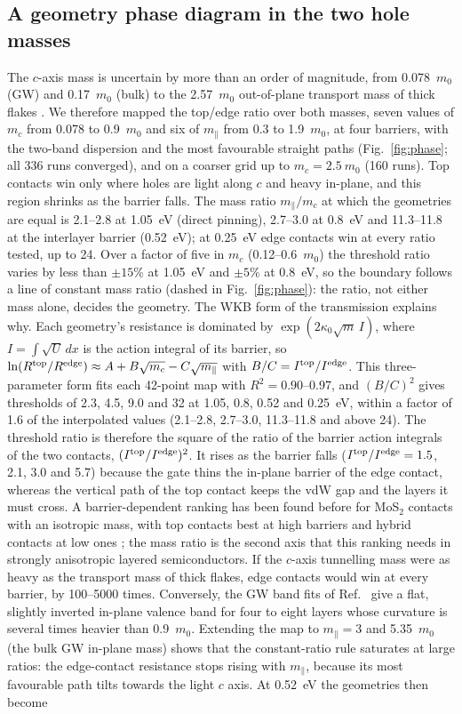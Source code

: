 \documentclass[11pt]{article}
\begin{document}
\subsection{A geometry phase diagram in the two hole masses}
\label{sec:phase}
The $c$-axis mass is uncertain by more than an order of magnitude, from 0.078~$m_0$ (GW) and 0.17~$m_0$ (bulk) to the 2.57~$m_0$ out-of-plane transport mass of thick flakes \cite{refsangwan}. We therefore mapped the top/edge ratio over both masses, seven values of $m_c$ from 0.078 to 0.9~$m_0$ and six of $m_\parallel$ from 0.3 to 1.9~$m_0$, at four barriers, with the two-band dispersion and the most favourable straight paths (Fig.~\ref{fig:phase}; all 336 runs converged), and on a coarser grid up to $m_c=2.5~m_0$ (160 runs). Top contacts win only where holes are light along $c$ and heavy in-plane, and this region shrinks as the barrier falls. The mass ratio $m_\parallel/m_c$ at which the geometries are equal is 2.1--2.8 at 1.05~eV (direct pinning), 2.7--3.0 at 0.8~eV and 11.3--11.8 at the interlayer barrier (0.52~eV); at 0.25~eV edge contacts win at every ratio tested, up to 24. Over a factor of five in $m_c$ (0.12--0.6~$m_0$) the threshold ratio varies by less than $\pm15$\% at 1.05~eV and $\pm5$\% at 0.8~eV, so the boundary follows a line of constant mass ratio (dashed in Fig.~\ref{fig:phase}): the ratio, not either mass alone, decides the geometry. The WKB form of the transmission explains why. Each geometry's resistance is dominated by $\exp(2\kappa_0\sqrt{m}\,I)$, where $I=\int\sqrt{U}\,dx$ is the action integral of its barrier, so $\ln(R^{\rm top}/R^{\rm edge})\approx A+B\sqrt{m_c}-C\sqrt{m_\parallel}$ with $B/C=I^{\rm top}/I^{\rm edge}$. This three-parameter form fits each 42-point map with $R^2=0.90$--0.97, and $(B/C)^2$ gives thresholds of 2.3, 4.5, 9.0 and 32 at 1.05, 0.8, 0.52 and 0.25~eV, within a factor of 1.6 of the interpolated values (2.1--2.8, 2.7--3.0, 11.3--11.8 and above 24). The threshold ratio is therefore the square of the ratio of the barrier action integrals of the two contacts, $(I^{\rm top}/I^{\rm edge})^2$. It rises as the barrier falls ($I^{\rm top}/I^{\rm edge}=1.5$, 2.1, 3.0 and 5.7) because the gate thins the in-plane barrier of the edge contact, whereas the vertical path of the top contact keeps the vdW gap and the layers it must cross. A barrier-dependent ranking has been found before for MoS$_2$ contacts with an isotropic mass, with top contacts best at high barriers and hybrid contacts at low ones \cite{refdeylgat25}; the mass ratio is the second axis that this ranking needs in strongly anisotropic layered semiconductors. If the $c$-axis tunnelling mass were as heavy as the transport mass of thick flakes, edge contacts would win at every barrier, by 100--5000 times. Conversely, the GW band fits of Ref.~\cite{refceferino} give a flat, slightly inverted in-plane valence band for four to eight layers whose curvature is several times heavier than 0.9~$m_0$. Extending the map to $m_\parallel=3$ and 5.35~$m_0$ (the bulk GW in-plane mass) shows that the constant-ratio rule saturates at large ratios: the edge-contact resistance stops rising with $m_\parallel$, because its most favourable path tilts towards the light $c$ axis. At 0.52~eV the geometries then become 
\end{document}

